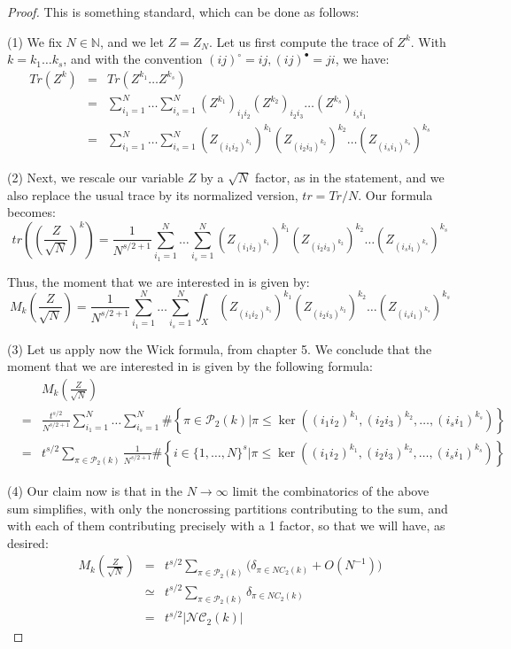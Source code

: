 \documentclass[12pt]{amsbook}
\begin{document}
\begin{proof}
This is something standard, which can be done as follows:

\medskip

(1) We fix $N\in\mathbb N$, and we let $Z=Z_N$. Let us first compute the trace of $Z^k$. With $k=k_1\ldots k_s$, and with the convention $(ij)^\circ=ij,(ij)^\bullet=ji$, we have:
\begin{eqnarray*}
Tr(Z^k)
&=&Tr(Z^{k_1}\ldots Z^{k_s})\\
&=&\sum_{i_1=1}^N\ldots\sum_{i_s=1}^N(Z^{k_1})_{i_1i_2}(Z^{k_2})_{i_2i_3}\ldots(Z^{k_s})_{i_si_1}\\
&=&\sum_{i_1=1}^N\ldots\sum_{i_s=1}^N(Z_{(i_1i_2)^{k_1}})^{k_1}(Z_{(i_2i_3)^{k_2}})^{k_2}\ldots(Z_{(i_si_1)^{k_s}})^{k_s}
\end{eqnarray*}

(2) Next, we rescale our variable $Z$ by a $\sqrt{N}$ factor, as in the statement, and we also replace the usual trace by its normalized version, $tr=Tr/N$. Our formula becomes:
$$tr\left(\left(\frac{Z}{\sqrt{N}}\right)^k\right)=\frac{1}{N^{s/2+1}}\sum_{i_1=1}^N\ldots\sum_{i_s=1}^N(Z_{(i_1i_2)^{k_1}})^{k_1}(Z_{(i_2i_3)^{k_2}})^{k_2}\ldots(Z_{(i_si_1)^{k_s}})^{k_s}$$

Thus, the moment that we are interested in is given by:
$$M_k\left(\frac{Z}{\sqrt{N}}\right)=\frac{1}{N^{s/2+1}}\sum_{i_1=1}^N\ldots\sum_{i_s=1}^N\int_X(Z_{(i_1i_2)^{k_1}})^{k_1}(Z_{(i_2i_3)^{k_2}})^{k_2}\ldots(Z_{(i_si_1)^{k_s}})^{k_s}$$

(3) Let us apply now the Wick formula, from chapter 5. We conclude that the moment that we are interested in is given by the following formula:
\begin{eqnarray*}
&&M_k\left(\frac{Z}{\sqrt{N}}\right)\\
&=&\frac{t^{s/2}}{N^{s/2+1}}\sum_{i_1=1}^N\ldots\sum_{i_s=1}^N\#\left\{\pi\in\mathcal P_2(k)\Big|\pi\leq\ker\left((i_1i_2)^{k_1},(i_2i_3)^{k_2},\ldots,(i_si_1)^{k_s}\right)\right\}\\
&=&t^{s/2}\sum_{\pi\in\mathcal P_2(k)}\frac{1}{N^{s/2+1}}\#\left\{i\in\{1,\ldots,N\}^s\Big|\pi\leq\ker\left((i_1i_2)^{k_1},(i_2i_3)^{k_2},\ldots,(i_si_1)^{k_s}\right)\right\}
\end{eqnarray*}

(4) Our claim now is that in the $N\to\infty$ limit the combinatorics of the above sum simplifies, with only the noncrossing partitions contributing to the sum, and with each of them contributing precisely with a 1 factor, so that we will have, as desired:
\begin{eqnarray*}
M_k\left(\frac{Z}{\sqrt{N}}\right)
&=&t^{s/2}\sum_{\pi\in\mathcal P_2(k)}\Big(\delta_{\pi\in NC_2(k)}+O(N^{-1})\Big)\\
&\simeq&t^{s/2}\sum_{\pi\in\mathcal P_2(k)}\delta_{\pi\in NC_2(k)}\\
&=&t^{s/2}|\mathcal{NC}_2(k)|
\end{eqnarray*}


\end{proof}
\end{document}
